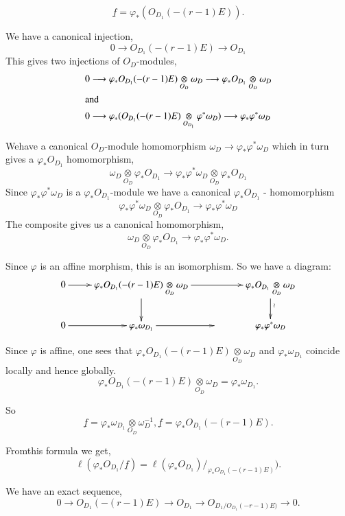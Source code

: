 \begin{claim*}
$$
\underline{f}=\varphi_*(O_{D_1}(-(r-1)E)).
$$

We have a canonical injection,
$$
0\longrightarrow O_{D_1}(-(r-1)E)\longrightarrow O_{D_1}
$$
This gives two injections of $O_D$-modules,
\begin{align*}
&0\longrightarrow\varphi_*O_{D_1}(-(r-1)E)\underset{O_D}{\otimes}
\omega_D\longrightarrow\varphi_*O_{D_1}\underset{O_D}{\otimes}\omega_D\\
\intertext{and}
&0\longrightarrow\varphi_*(O_{D_1}(-(r-1)E)\underset{O_{D_1}}{\otimes}
\varphi^*\omega_D)\longrightarrow\varphi_*\varphi^*\omega_D
\end{align*}
\end{claim*}

We\pageoriginale have a canonical $O_D$-module homomorphism $\omega_D
\longrightarrow\varphi_*\varphi^*\omega_D$ which in turn gives a
$\varphi_*O_{D_1}$ homomorphism,
$$
\omega_D\underset{O_D}{\otimes}\varphi_*O_{D_1}\longrightarrow\varphi_*
\varphi^*\omega_D\underset{O_D}{\otimes}\varphi_*O_{D_1}
$$
Since $\varphi_*\varphi^*\omega_D$ is a $\varphi_*O_{D_1}$-module we
have a canonical $\varphi_*O_{D_1}$ - homomorphism
$$
\varphi_*\varphi^*\omega_D\underset{O_D}{\otimes}\varphi_*O_{D_1}
\longrightarrow\varphi_*\varphi^*\omega_D
$$
The composite gives us a canonical homomorphism,
$$
\omega_D\underset{O_D}{\otimes}\varphi_*O_{D_1}\longrightarrow
\varphi_*\varphi^*\omega_D.
$$

Since $\varphi$ is an affine morphism, this is an isomorphism. So we
have a diagram:
\[
\xymatrix{
0\ar[r] & \varphi_*O_{D_1}(-(r-1)E)\underset{O_D}{\otimes} \omega_D
\ar[rr]\ar[d] & &
\varphi_*O_{D_1}\underset{O_D}{\otimes}\omega_D\ar[d]^{\wr}\\
0\ar[r] & \varphi_*\omega_{D_1}\ar[r] & & \varphi_*\varphi^*\omega_D 
}
\]

Since $\varphi$ is affine, one sees that
$\varphi_*O_{D_1}(-(r-1)E) \underset{O_D}{\otimes}\omega_D$ and
$\varphi_*\omega_{D_1}$ coincide locally and hence globally. \ie
$$
\varphi_*O_{D_1}(-(r-1)E)\underset{O_D}{\otimes}\omega_D=\varphi_*\omega_{D_1}.
$$

So
$$
\underline{f}=\varphi_*\omega_{D_1}\underset{O_D}{\otimes}\omega_D^{-1},
\underline{f}=\varphi_*O_{D_1}(-(r-1)E).
$$

From\pageoriginale this formula we get,
$$
\ell(\varphi_*O_{D_1}/\underline{f})=\ell(\varphi_*
O_{D_1})/_{\varphi_*O_{D_1}(-(r-1)E)}). 
$$

We have an exact sequence,
$$
0\longrightarrow O_{D_1}(-(r-1)E)\longrightarrow O_{D_1}\longrightarrow
O_{{D_1}/O_{D_1}(-r-1)E)} \longrightarrow 0.
$$


